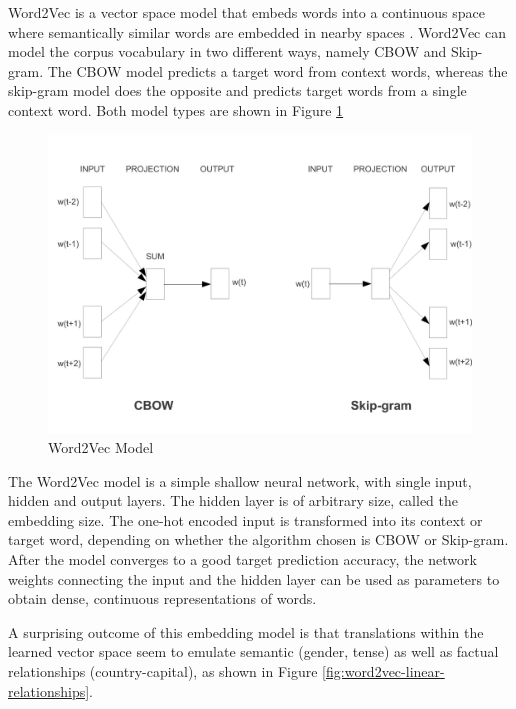 Word2Vec is a vector space model that embeds words into a continuous space where semantically similar words are embedded in nearby spaces \citep{mikolov2013distributed,mikolov2013linguistic,le2014distributed}. Word2Vec can model the corpus vocabulary in two different ways, namely CBOW and Skip-gram. The CBOW model predicts a target word from context words, whereas the skip-gram model does the opposite and predicts target words from a single context word. Both model types are shown in Figure \ref{fig:efficient-models}

\begin{figure}[ht]
	\centering
	\includegraphics[width=\textwidth]{images/efficient-models}
	\caption{\label{fig:efficient-models} Word2Vec Model}
\end{figure}

The Word2Vec model is a simple shallow neural network, with single input, hidden and output layers. The hidden layer is of arbitrary size, called the embedding size. The one-hot encoded input is transformed into its context or target word, depending on whether the algorithm chosen is CBOW or Skip-gram. After the model converges to a good target prediction accuracy, the network weights connecting the input and the hidden layer can be used as parameters to obtain dense, continuous representations of words.

A surprising outcome of this embedding model is that translations within the learned vector space seem to emulate semantic (gender, tense) as well as factual relationships (country-capital), as shown in Figure \ref{fig:word2vec-linear-relationships}.

